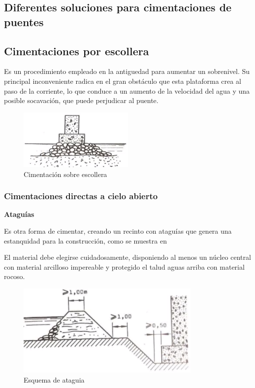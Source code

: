 \documentclass[../main.tex]{subfiles}
\begin{document}
\subsection*{Diferentes soluciones para cimentaciones de puentes}
\subsection{Cimentaciones por escollera}

Es un procedimiento empleado en la antiguedad para aumentar un sobrenivel. Su 
principal inconveniente radica en el gran obstáculo que esta plataforma crea al
paso de la corriente, lo que conduce a un aumento de la velocidad del agua y una
posible socavación, que puede perjudicar al puente.

\begin{figure}[ht]
  \centering
  \includegraphics[width=0.5\textwidth]{../images/20210419/escollera}
  \caption{Cimentación sobre escollera}
  \label{fig:escollera}
\end{figure}

\subsubsection{Cimentaciones directas a cielo abierto}

\textbf{Ataguías}

Es otra forma de cimentar, creando un recinto con ataguías que genera una
estanquidad para la construcción, como se muestra en 

El material debe elegirse cuidadosamente, disponiendo al menos un núcleo central
con material arcilloso impereable y protegido el talud aguas arriba con material
rocoso.

\begin{figure}[htpb]
  \centering
  \includegraphics[width=0.8\textwidth]{../images/20210419/ataguia}
  \caption{Esquema de ataguia}
  \label{fig:ataguia}
\end{figure}
\end{document}
